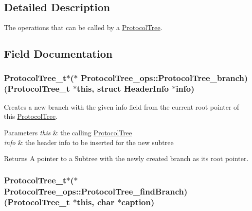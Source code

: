 \subsection{Detailed Description}
The operations that can be called by a \hyperlink{struct_protocol_tree}{Protocol\+Tree}. 

\subsection{Field Documentation}
\hypertarget{struct_protocol_tree__ops_a06a5e56e65a501e6b0fb212f9c2203d5}{}
\subsubsection[{Protocol\+Tree\+\_\+branch}]{\setlength{\rightskip}{0pt plus 5cm}Protocol\+Tree\+\_\+t$\ast$($\ast$ Protocol\+Tree\+\_\+ops\+::\+Protocol\+Tree\+\_\+branch) (Protocol\+Tree\+\_\+t $\ast$this, struct {\bf Header\+Info} $\ast$info)}\label{struct_protocol_tree__ops_a06a5e56e65a501e6b0fb212f9c2203d5}


Creates a new branch with the given info field from the current root pointer of this \hyperlink{struct_protocol_tree}{Protocol\+Tree}. 


\begin{DoxyParams}{Parameters}
{\em this} & the calling \hyperlink{struct_protocol_tree}{Protocol\+Tree} \\
\hline
{\em info} & the header info to be inserted for the new subtree\\
\hline
\end{DoxyParams}
\begin{DoxyReturn}{Returns}
A pointer to a Subtree with the newly created branch as its root pointer. 
\end{DoxyReturn}
\hypertarget{struct_protocol_tree__ops_ac182caeb095b0f9d5fe44363672e55b1}{}
\subsubsection[{Protocol\+Tree\+\_\+find\+Branch}]{\setlength{\rightskip}{0pt plus 5cm}Protocol\+Tree\+\_\+t$\ast$($\ast$ Protocol\+Tree\+\_\+ops\+::\+Protocol\+Tree\+\_\+find\+Branch) (Protocol\+Tree\+\_\+t $\ast$this, char $\ast${\bf caption})}\label{struct_protocol_tree__ops_ac182caeb095b0f9d5fe44363672e55b1}


